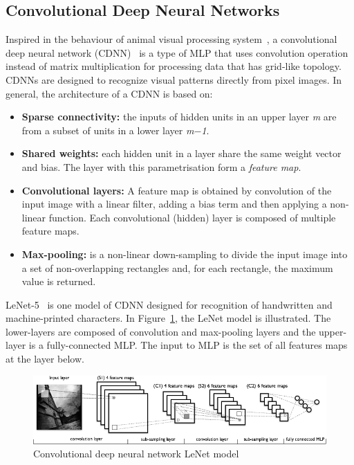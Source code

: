 \subsection{Convolutional Deep Neural Networks}
Inspired in the behaviour of animal visual processing system~\parencite{1_deeplearning.net_2015}, a convolutional deep neural network (CDNN)~\parencite{Bengio-et-al-2015-Book, 1_ufldlstanfordedu_2015} is a type of MLP that uses convolution operation instead of matrix multiplication for processing data that has grid-like topology. CDNNs are designed to recognize visual patterns directly from pixel images. In general, the architecture of a CDNN is based on:
\begin{itemize}
	\item \textbf{Sparse connectivity:} the inputs of hidden units in an upper layer \emph{m} are from a subset of units in a lower layer \emph{m$-$1}.
	\item \textbf{Shared weights:} each hidden unit in a layer share the same weight vector and bias. The layer with this parametrisation form a \textit{feature map}.
	\item \textbf{Convolutional layers:} A feature map is obtained by convolution of the input image with a linear filter, adding a bias term and then applying a non-linear function. Each convolutional (hidden) layer is composed of multiple feature maps.
	\item \textbf{Max-pooling:} is a non-linear down-sampling to divide the input image into a set of non-overlapping rectangles and, for each rectangle, the maximum value is returned.
\end{itemize}

LeNet-5~\parencite{1_lecun_2015} is one model of CDNN designed for recognition of handwritten and machine-printed characters. In Figure~\ref{fig:lenet}, the LeNet model is illustrated. The lower-layers are composed of convolution and max-pooling layers and the upper-layer is a fully-connected MLP. The input to MLP is the set of all features maps at the layer below.
\begin{figure}[ht!]
	\centering
	\includegraphics[width=1\textwidth]{chapter2/mylenet.png}
	\caption{Convolutional deep neural network LeNet model \parencite{1_deeplearning.net_2015}}
\label{fig:lenet}
\end{figure}

